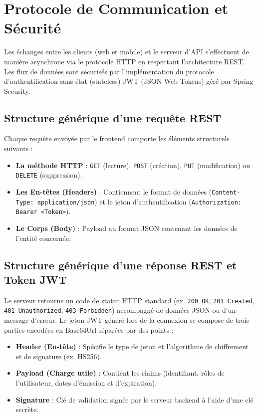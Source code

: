 \section{Protocole de Communication et Sécurité}
\label{sec:protocole_communication_securite}

Les échanges entre les clients (web et mobile) et le serveur d'API s'effectuent de manière asynchrone via le protocole HTTP en respectant l'architecture REST. Les flux de données sont sécurisés par l'implémentation du protocole d'authentification sans état (stateless) JWT (JSON Web Tokens) géré par Spring Security.

\subsection{Structure générique d'une requête REST}
Chaque requête envoyée par le frontend comporte les éléments structurels suivants :
\begin{itemize}
    \item \textbf{La méthode HTTP} : \texttt{GET} (lecture), \texttt{POST} (création), \texttt{PUT} (modification) ou \texttt{DELETE} (suppression).
    \item \textbf{Les En-têtes (Headers)} : Contiennent le format de données (\texttt{Content-Type: application/json}) et le jeton d'authentification (\texttt{Authorization: Bearer <Token>}).
    \item \textbf{Le Corps (Body)} : Payload au format JSON contenant les données de l'entité concernée.
\end{itemize}

\subsection{Structure générique d'une réponse REST et Token JWT}
Le serveur retourne un code de statut HTTP standard (ex. \texttt{200 OK}, \texttt{201 Created}, \texttt{401 Unauthorized}, \texttt{403 Forbidden}) accompagné de données JSON ou d'un message d'erreur. 
Le jeton JWT généré lors de la connexion se compose de trois parties encodées en Base64Url séparées par des points :
\begin{itemize}
    \item \textbf{Header (En-tête)} : Spécifie le type de jeton et l'algorithme de chiffrement et de signature (ex. HS256).
    \item \textbf{Payload (Charge utile)} : Contient les claims (identifiant, rôles de l'utilisateur, dates d'émission et d'expiration).
    \item \textbf{Signature} : Clé de validation signée par le serveur backend à l'aide d'une clé secrète.
\end{itemize}

